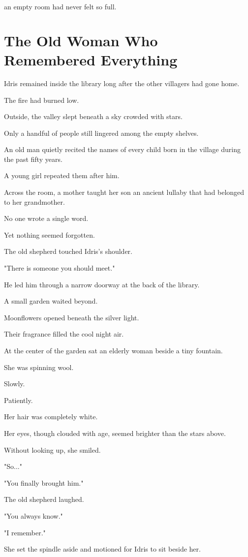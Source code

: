 \documentclass[12pt,openany]{book}
\begin{document}
an empty room had never felt so full.
\section*{The Old Woman Who Remembered Everything}

Idris remained inside the library long after the other villagers had gone home.

The fire had burned low.

Outside, the valley slept beneath a sky crowded with stars.

Only a handful of people still lingered among the empty shelves.

An old man quietly recited the names of every child born in the village during the past fifty years.

A young girl repeated them after him.

Across the room, a mother taught her son an ancient lullaby that had belonged to her grandmother.

No one wrote a single word.

Yet nothing seemed forgotten.

The old shepherd touched Idris's shoulder.

"There is someone you should meet."

He led him through a narrow doorway at the back of the library.

A small garden waited beyond.

Moonflowers opened beneath the silver light.

Their fragrance filled the cool night air.

At the center of the garden sat an elderly woman beside a tiny fountain.

She was spinning wool.

Slowly.

Patiently.

Her hair was completely white.

Her eyes, though clouded with age, seemed brighter than the stars above.

Without looking up, she smiled.

"So..."

"You finally brought him."

The old shepherd laughed.

"You always know."

"I remember."

She set the spindle aside and motioned for Idris to sit beside her.
\end{document}

